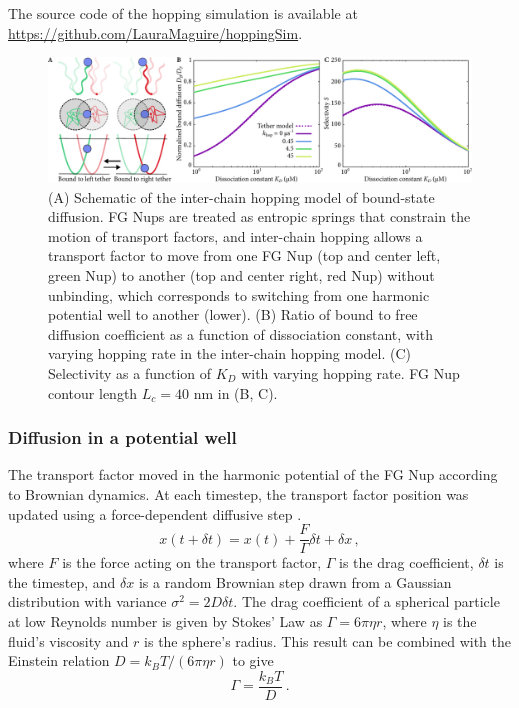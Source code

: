 The source code of the hopping simulation is available at \url{https://github.com/LauraMaguire/hoppingSim}.

\begin{figure}[t!]
\centering
\includegraphics[width = \textwidth]{figs/ch02/fig4.pdf}
\caption[Selectivity from inter-chain hopping.]{(A) Schematic of the inter-chain hopping model of bound-state diffusion. FG Nups are treated as entropic springs that constrain the motion of transport factors, and inter-chain hopping allows a transport factor to move from one FG Nup (top and center left, green Nup) to another (top and center right, red Nup) without unbinding, which corresponds to switching from one harmonic potential well to another (lower). (B) Ratio of bound to free diffusion coefficient as a function of dissociation constant, with varying hopping rate in the inter-chain hopping model.  (C) Selectivity as a function of $K_D$ with varying hopping rate. FG Nup contour length $L_c = 40$ nm in (B, C). }
\label{fig:hopping}
\end{figure}

\subsubsection{Diffusion in a potential well}

The transport factor moved in the harmonic potential of the FG Nup according to Brownian dynamics. At each timestep, the transport factor position was updated using a force-dependent diffusive step \cite{blackwell17}.
\begin{equation}
  x(t+\delta t) = x(t) + \frac{F}{\Gamma} \delta t + \delta x\,,
\end{equation} 
where $F$ is the force acting on the transport factor, $\Gamma$ is the drag coefficient, $\delta t$ is the timestep, and $\delta x$ is a random Brownian step drawn from a Gaussian distribution with variance $\sigma^2 = 2 D \delta t$. The drag coefficient of a spherical particle at low Reynolds number is given by Stokes' Law as $\Gamma = 6 \pi \eta r$, where $\eta$ is the fluid's viscosity and $r$ is the sphere's radius.  This result can be combined with the Einstein relation $D = k_B T / (6\pi \eta r)$ to give
\begin{equation}
\Gamma= \frac{k_B T}{D}\,.
\end{equation}
 
